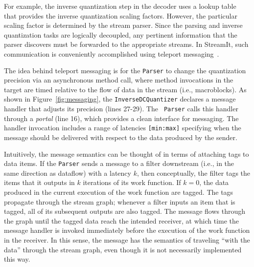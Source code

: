 For example, the inverse quantization step in the decoder uses a
lookup table that provides the inverse quantization scaling factors.
However, the particular scaling factor is determined by the stream
parser. Since the parsing and inverse quantization tasks are logically
decoupled, any pertinent information that the parser discovers must be
forwarded to the appropriate streams.  In StreamIt, such
communication is conveniently accomplished using teleport
messaging~\cite{thies05ppopp}.

The idea behind teleport messaging is for the {\tt Parser} to change
the quantization precision via an asynchronous method call, where
method invocations in the target are timed relative to the flow of
data in the stream (i.e., macroblocks). As shown in
Figure~\ref{fig:messaging}, the {\tt InverseDCQuantizer} declares a
message handler that adjusts its precision (lines 27-29). The {\tt
Parser} calls this handler through a {\it portal} (line 16), which
provides a clean interface for messaging.  The handler invocation
includes a range of latencies {\tt [min:max]} specifying when the
message should be delivered with respect to the data produced by the
sender.

Intuitively, the message semantics can be thought of in terms of
attaching tags to data items.  If the {\tt Parser} sends a message to
a filter downstream (i.e., in the same direction as dataflow) with a
latency $k$, then conceptually, the filter tags the items that it
outputs in $k$ iterations of its work function. If $k=0$, the data
produced in the current execution of the work function are tagged. The
tags propagate through the stream graph; whenever a filter inputs an
item that is tagged, all of its subsequent outputs are also
tagged. The message flows through the graph until the tagged data
reach the intended receiver, at which time the message handler is
invoked immediately before the execution of the work function in the
receiver.  In this sense, the message has the semantics of traveling
``with the data'' through the stream graph, even though it is not
necessarily implemented this way.


